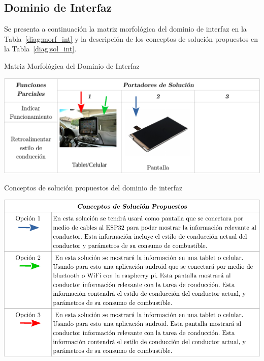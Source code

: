 \subsection{Dominio de Interfaz}
Se presenta a continuación la matriz morfológica del dominio de interfaz en la Tabla~\ref{diag:morf_int} y la descripción de los conceptos de solución propuestos en la Tabla~\ref{diag:sol_int}.
\begin{table}[htbp!]
  \caption{Matriz Morfológica del Dominio de Interfaz}
  \label{diag:morf_int}
  \centering
  \includegraphics[width=\linewidth]{morf_int.pdf}
\end{table}

\begin{table}[htbp!]
  \caption{Conceptos de solución propuestos del dominio de interfaz}
  \label{diag:sol_int}
  \includegraphics[width=\linewidth]{sol_int.pdf}
\end{table}


